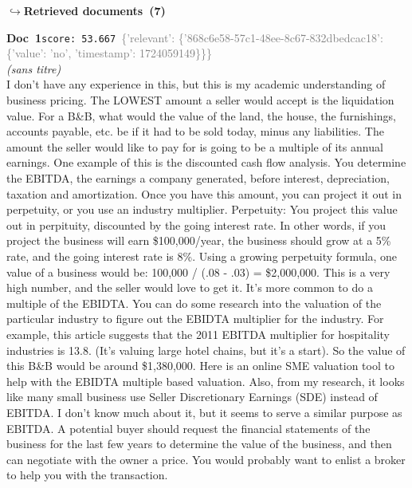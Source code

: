\documentclass[a4paper,11pt]{article}
\begin{document}
\noindent\hfill{\footnotesize\textcolor{doccolor}{\textbf{$\hookrightarrow$\enspace Retrieved documents~(7)}}}
\begin{docenv}
{\footnotesize\textcolor{doccolor}{\textbf{Doc~1}}}\hfill{\tiny\texttt{score:~53.667}}\ {\tiny\textcolor{gray}{\{'relevant': \{'868c6e58-57c1-48ee-8c67-832dbedcac18': \{'value': 'no', 'timestamp': 1724059149\}\}\}}}\\[3pt]
{\small\textit{(sans titre)}}\\[2pt]
\vspace{2pt}
{\footnotesize 
I don't have any experience in this, but this is my academic understanding of business pricing.  The LOWEST amount a seller would accept is the liquidation value. For a B\&B, what would the value of the land, the house, the furnishings, accounts payable, etc. be if it had to be sold today, minus any liabilities.  The amount the seller would like to pay for is going to be a multiple of its annual earnings. One example of this is the discounted cash flow analysis. You determine the EBITDA, the earnings a company generated, before interest,  depreciation, taxation and amortization.  Once you have this amount, you can project it out in perpetuity, or you use an industry multiplier.  Perpetuity:  You project this value out in perpituity, discounted by the going interest rate. In other words, if you project the business will earn \$100,000/year, the business should grow at a 5\% rate, and the going interest rate is 8\%. Using a growing perpetuity formula, one value of a business would be: 100,000 / (.08 - .03) = \$2,000,000.  This is a very high number, and the seller would love to get it.  It's more common to do a multiple of the EBIDTA. You can do some research into the valuation of the particular industry to figure out the EBIDTA multiplier for the industry. For example, this article suggests that the 2011 EBITDA multiplier for hospitality industries is 13.8. (It's valuing large hotel chains, but it's a start). So the value of this B\&B would be around \$1,380,000. Here is an online SME valuation tool to help with the EBIDTA multiple based valuation. Also, from my research, it looks like many small business use Seller Discretionary Earnings  (SDE) instead of EBITDA. I don't know much about it, but it seems to serve a similar purpose as EBITDA.  A potential buyer should request the financial statements of the business for the last few years to determine the value of the business, and then can negotiate with the owner a price. You would probably want to enlist a broker to help you with the transaction.}
\end{docenv}
\end{document}
